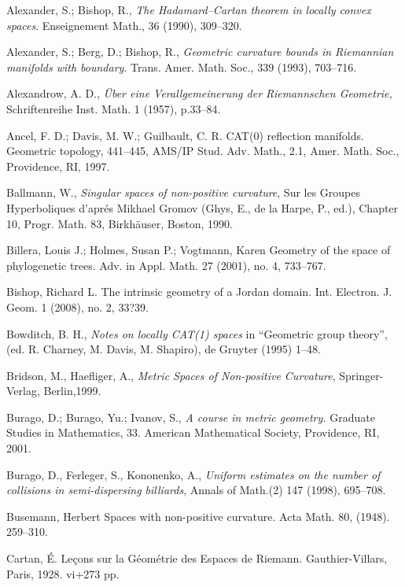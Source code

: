 \begin{thebibliography}{52}

Alexander, S.; Bishop, R., \textit{The Hadamard--Cartan theorem in locally convex spaces}. Enseignement Math., 36 (1990), 309--320.

 Alexander, S.; Berg, D.; Bishop, R., \textit{Geometric curvature bounds in Riemannian manifolds with
boundary}. Trans. Amer. Math. Soc., 339 (1993), 703--716.

 Alexandrow, A. D.,  \textit{\"Uber eine Verallgemeinerung der Riemannschen Geometrie,}
Schriftenreihe Inst. Math. 1 (1957), p.33--84.

 Ancel, F. D.; Davis, M. W.; Guilbault, C. R.
CAT(0) reflection manifolds. Geometric topology, 441--445,
AMS/IP Stud. Adv. Math., 2.1, Amer. Math. Soc., Providence, RI, 1997.

Ballmann, W., \textit{Singular spaces of non-positive curvature}, Sur les Groupes Hyperboliques d'apr\'{e}s Mikhael Gromov (Ghys, E., de la Harpe, P., ed.), Chapter 10, Progr. Math. 83, Birkh\"auser, Boston, 1990. 

 Billera, Louis J.; Holmes, Susan P.; Vogtmann, Karen Geometry of the space of phylogenetic trees. Adv. in Appl. Math. 27 (2001), no. 4, 733--767.

Bishop, Richard L. The intrinsic geometry of a Jordan domain. Int. Electron. J. Geom. 1 (2008), no. 2, 33?39.

 Bowditch, B. H.,
\textit{Notes on locally CAT(1) spaces} 
in ``Geometric group theory'', (ed. R. Charney, M. Davis, M. Shapiro), de Gruyter (1995) 1--48.

Bridson, M., Haefliger, A.,
\textit{Metric Spaces of Non-positive Curvature},
Springer-Verlag, Berlin,1999.

 Burago, D.; Burago, Yu.; Ivanov, S., \textit{A course in metric geometry.} Graduate Studies in Mathematics, 33. American Mathematical Society, Providence, RI, 2001. 

Burago, D., Ferleger, S., Kononenko, A.,
\textit{Uniform estimates on the number of collisions in semi-dispersing billiards},
Annals of Math.(2) 147 (1998), 695--708.

Busemann, Herbert 
Spaces with non-positive curvature. Acta Math. 80, (1948). 259--310.

Cartan, \'E.
Le\c{c}ons sur la G\'eom\'etrie des Espaces de Riemann. 
Gauthier-Villars, Paris, 1928. vi+273 pp.


\end{thebibliography}
